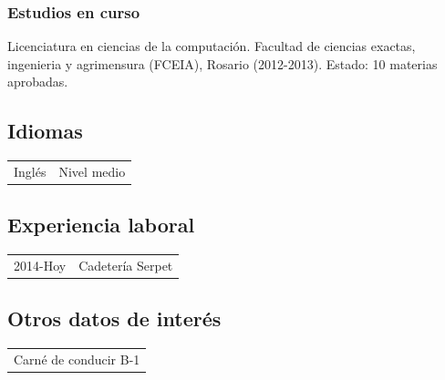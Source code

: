 \documentclass[10pt]{article}
\begin{document}
\subsubsection*{Estudios en curso}
Licenciatura en ciencias de la computación. Facultad de ciencias exactas, ingenieria y agrimensura (FCEIA), Rosario (2012-2013).
 Estado: 10 materias aprobadas.
\subsection*{Idiomas}
\begin{tabular}{l l}
  Inglés&Nivel medio\\
\end{tabular}
\subsection*{Experiencia laboral}
\begin{tabular}{l l}
  2014-Hoy&Cadetería Serpet\\
\end{tabular}
\subsection*{Otros datos de interés}
\begin{tabular}{l}
  Carné de conducir B-1\\
\end{tabular}
\end{document}
